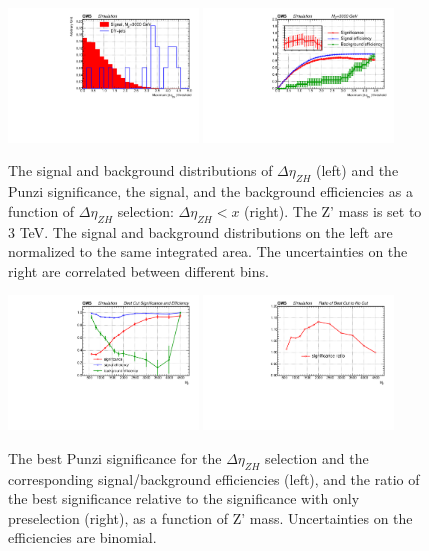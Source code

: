 \begin{figure}[htbp]
   \centering
   \includegraphics[width=0.45\textwidth]{optimization/plot_dEta/plot_dEta_input_in_Zprime_mass_3000.pdf}
   \includegraphics[width=0.45\textwidth]{optimization/plot_dEta/plot_dEta_Significance_and_efficiency_for_Zprme_M_3000.pdf}
   \caption{The signal and background distributions of $\Delta \eta_{ZH}$ 
(left) and the Punzi significance, the signal, and the background efficiencies as a 
     function of $\Delta \eta_{ZH}$ selection: $\Delta \eta_{ZH} < x$ (right). 
     The Z' mass is set to 3 TeV. The signal and background distributions on 
     the left are normalized to the same integrated area. The uncertainties 
on the right are correlated between different bins.}
   \label{fig:detathree}
\end{figure}


\begin{figure}[htbp]
   \centering
   \includegraphics[width=0.45\textwidth]{optimization/plot_dEta/plot_dEta_best_cut_significance_and_efficiency.pdf}
   \includegraphics[width=0.45\textwidth]{optimization/plot_dEta/plot_dEta_significance_ratio_of_best_cut_to_no_cut.pdf}
   \caption{The best Punzi significance for the $\Delta \eta_{ZH}$ selection 
and the corresponding signal/background efficiencies (left), and the ratio 
of the best significance relative to the significance with only preselection 
(right),  as a function of Z' mass. Uncertainties on the efficiencies are 
binomial.}
  \label{fig:detamass}
\end{figure}


